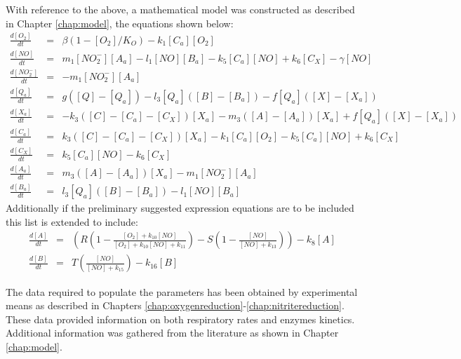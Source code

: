 \noindent With reference to the above, a mathematical model was constructed as described in Chapter \ref{chap:model}, the equations shown below:
\begin{eqnarray*}
\frac{d[O_2]}{dt} & = & \beta(1-[O_2]/K_O) - k_{1}[C_a][O_2]\\ \nonumber
\frac{d[NO]}{dt} & = & m_{1}[NO_2^-][A_a] - l_1[NO][B_a] - k_5[C_a][NO] + k_6 [C_X] - \gamma[NO]\\ \nonumber
\frac{d[NO_2^-]}{dt} & = & - m_{1}[NO_2^-][A_a]\\ \nonumber
\frac{d[Q_a]}{dt} & = & g([Q] - [Q_a]) - l_3[Q_a]([B] - [B_a]) - f[Q_a]([X]-[X_a])\\ \nonumber
\frac{d[X_a]}{dt} & = & -k_3([C] - [C_a] - [C_X])[X_a]  - m_3([A] - [A_a])[X_a] + f[Q_a]([X]-[X_a])\\ \nonumber
\frac{d[C_a]}{dt} & = & k_3([C] - [C_a] - [C_X])[X_a] - k_{1}[C_a][O_2] - k_5[C_a][NO] + k_6[C_X]\\ \nonumber
\frac{d[C_X]}{dt} & = & k_5[C_a][NO] - k_6 [C_X]\\ \nonumber
\frac{d[A_a]}{dt} & = & m_3([A] - [A_a])[X_a]- m_{1}[NO_2^-][A_a]\\ \nonumber
\frac{d[B_a]}{dt} & = & l_3[Q_a]([B] - [B_a]) - l_1[NO][B_a]
\end{eqnarray*}
Additionally if the preliminary suggested expression equations are to be included this list is extended to include:
\begin{eqnarray*}
\frac{d[A]}{dt} & = & \left(R\left(1 - \frac{[O_2] + k_{10}[NO]}{[O_2] + k_{10}[NO] + k_{11}}\right) - S\left(1 - \frac{[NO]}{[NO] + k_{13}}\right)\right) - k_8[A] \nonumber \\
\frac{d[B]}{dt} & = & T \left(\frac{[NO]}{[NO] + k_{15}}\right) - k_{16}[B]
\end{eqnarray*}

The data required to populate the parameters has been obtained by experimental means as described in Chapters \ref{chap:oxygenreduction}-\ref{chap:nitritereduction}. These data provided information on both respiratory rates and enzymes kinetics. Additional information was gathered from the literature as shown in Chapter \ref{chap:model}.

